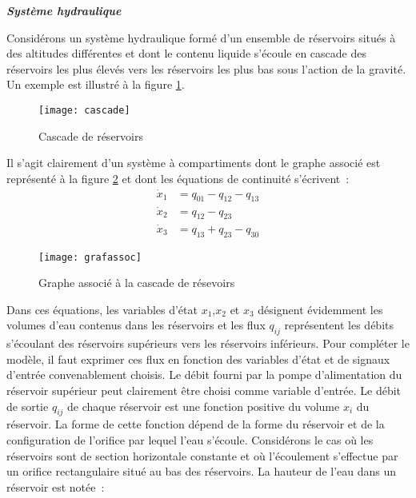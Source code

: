 \begin{exemple}\label{systhyd}{\bf \em Système hydraulique}

Considérons un système hydraulique formé d'un ensemble 
de réservoirs situés à des altitudes différentes
et dont le contenu liquide s'écoule \og en cascade \gf
des réservoirs les plus élevés vers les réservoirs les plus bas sous l'action
de la gravité. Un exemple est illustré à la figure \ref{Fig:cascade}.
\begin{figure}[h] 
\begin{center}
\texttt{[image: cascade]}
\caption{Cascade de réservoirs}
\label{Fig:cascade}
\end{center} 
\end{figure}

Il s'agit clairement d'un système à compartiments dont le graphe associé
est représenté à la figure \ref{Fig:grafassoc} et dont les équations de 
continuité s'écrivent~:
\begin{equation*} \begin{split} 
\dot x_1 &= q_{01} - q_{12} - q_{13} \\
\dot x_2 &=  q_{12} - q_{23} \\
\dot x_3 &= q_{13} + q_{23} - q_{30} 
\end{split} \end{equation*}
\begin{figure}[h] 
\begin{center}
\texttt{[image: grafassoc]}
\caption{Graphe associé à la cascade de résevoirs}
\label{Fig:grafassoc}
\end{center} 
\end{figure}
Dans ces équations, les variables d'état $x_1$,$ x_2$ et $x_3$ désignent 
évidemment les volumes d'eau contenus dans les réservoirs et les flux 
$q_{ij}$ représentent les débits s'écoulant des réservoirs supérieurs
vers les réservoirs inférieurs. Pour compléter le modèle, il faut 
exprimer ces flux en fonction des variables d'état et de signaux d'entrée
convenablement choisis.
Le débit fourni par la
pompe d'alimentation du réservoir supérieur peut clairement être choisi
comme variable d'entrée. Le débit de sortie $q_{ij}$
de chaque réservoir est une fonction positive du volume $x_i$ du réservoir. La forme de cette fonction dépend de la forme du réservoir et de la configuration de l'orifice par lequel l'eau s'écoule. Considérons le cas où les réservoirs sont de section horizontale constante et où l'écoulement s'effectue par un orifice rectangulaire situé au bas des réservoirs. La hauteur de l'eau dans un réservoir est notée~:

\end{exemple}
